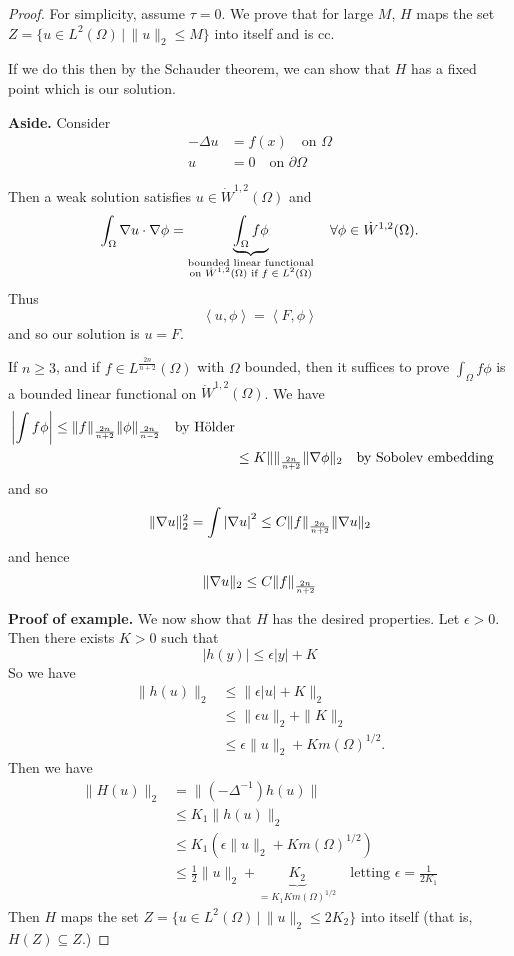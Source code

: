 \documentclass[10pt, oneside, reqno]{amsart}
\theoremstyle{plain}%
\numberwithin{equation}{section}
\theoremstyle{definition}
\theoremstyle{remark}
\newcommand{\given}{ \, | \,}
\newcommand{\iprod}[1]{\left\langle #1 \right\rangle}
\begin{document}
\begin{proof}
	For simplicity, assume $\tau = 0$.  We prove that for large $M$, $H$ maps the set $ Z = \{ u \in L^2(\Omega) \given \| u \|_2 \leq M \}$ into itself and is cc.  
	
	If we do this then by the Schauder theorem, we can show that $H$ has a fixed point which is our solution.
	
	\textbf{Aside.}  Consider \begin{align*}
		-\Delta u &= f(x) \quad \text{on $\Omega$} \\
		u &= 0 \quad \text{on $\partial \Omega$}
	\end{align*}
	
	Then a weak solution satisfies $u \in \dot W^{1, 2}(\Omega)$ and \[
		\int_\Omega \nabla u \cdot \nabla \phi = \underbrace{\int_\Omega f \phi}_{\substack{\text{bounded linear functional} \\ \text{on $\dot W^{1,2}(\Omega)$ if $f \in L^2(\Omega)$}}} \quad \forall \phi \in \dot W^{1, 2}(\Omega).
	\]  Thus \[
		\iprod{u, \phi} = \iprod{F, \phi}
	\] and so our solution is $u = F$.
	
	  If $n \geq 3$, and if $f \in L^{\frac{2n}{n+2}}(\Omega)$ with $\Omega$ bounded, then it suffices to prove $\int_\Omega f \phi$ is a bounded linear functional on $\dot W^{1,2}(\Omega)$.  We have \begin{align*}
	  	\left| \int f \phi \right| \leq \| f \|_{\frac{2n}{n+2}} \| \phi \|_{\frac{2n}{n-2}} \quad \text{by H\"older} \\
	&\leq K \|  \|_{\frac{2n}{n+2}} \| \nabla \phi \|_2 \quad \text{by Sobolev embedding}
	  \end{align*} and so \begin{align*}
	  \| \nabla u \|_2^2 =	\int \left| \nabla u \right|^2 \leq C \| f \|_{\frac{2n}{n+2}} \| \nabla u \|_2
	  \end{align*} and hence \[
	  	\| \nabla u \|_2 \leq C \| f \|_{\frac{2n}{n+2}}
	  \]
	
	\textbf{Proof of example.}  We now show that $H$ has the desired properties.  Let $\epsilon > 0$.  Then there exists $K > 0$ such that \[
		|h(y) | \leq \epsilon |y| + K
	\]  So we have \begin{align*}
		\| h(u) \|_2 	&\leq \| \epsilon|u| + K \|_2 \\
						&\leq \| \epsilon u \|_2 + \| K \|_2 \\
						&\leq \epsilon \| u \|_2 + K m(\Omega)^{1/2}. \tag{$\star$}
	\end{align*} Then we have \begin{align*}
		\| H(u) \|_2 	&= \| (-\Delta^{-1}) h(u) \| \\
		 				&\leq K_1 \| h(u) \|_2 \\
						&\leq K_1 \left( \epsilon \| u \|_2 + K m(\Omega)^{1/2} \right) \\
						&\leq \frac{1}{2} \| u \|_2 + \underbrace{K_2}_{= K_1 K m(\Omega)^{1/2}} \quad \text{letting $\epsilon = \frac{1}{2K_1}$}
	\end{align*}  Then $H$ maps the set $ Z = \{ u \in L^2(\Omega) \given \| u \|_2 \leq 2 K_2 \}$ into itself (that is, $H(Z) \subseteq Z$.)
	

\end{proof}
\end{document}
